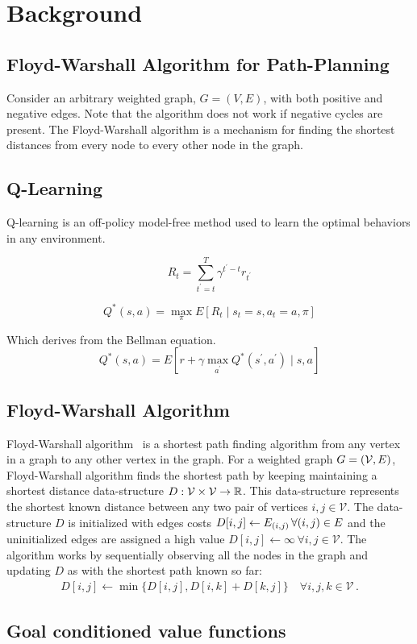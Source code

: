 \section{Background}

\subsection{Floyd-Warshall Algorithm for Path-Planning}

Consider an arbitrary weighted graph, $G = (V, E)$, with both positive and
negative edges. Note that the algorithm does not work if negative cycles
are present. The Floyd-Warshall algorithm is a mechanism for finding the
shortest distances from every node to every other node in the graph. 


\subsection{Q-Learning}
Q-learning is an off-policy model-free method used to learn the optimal
behaviors in any environment. 

\begin{equation}
    R_t = \sum_{t^{'}=t}^{T} \gamma^{t^{'}-t} r_{t^{'}}
\end{equation}

\begin{equation}
    Q^*(s, a) = \max_{\pi} E[R_t \mid s_t=s, a_t=a, \pi]
\end{equation}


\noindent
Which derives from the Bellman equation.
\begin{equation}
    Q^*(s, a) = E[r + \gamma \max_{a^{'}} Q^*(s^{'}, a^{'}) \mid s, a]
\end{equation}

\subsection{Floyd-Warshall Algorithm}
\newcommand{\vertices}{\mathcal{V}}
\newcommand{\wts}{W}
\newcommand{\fwds}{D}

Floyd-Warshall algorithm~\citep{floydwarshall1962} is a shortest path finding
algorithm from any vertex in a graph to any other vertex in the graph.
For a weighted graph $G = (\vertices, \edges)$, Floyd-Warshall algorithm
finds the shortest path by keeping maintaining a shortest distance
data-structure $\fwds : \vertices \times \vertices \rightarrow \R$.
This data-structure represents the shortest known distance between any
two pair of vertices $i, j \in \vertices$.
The data-structure $\fwds$ is initialized with edges costs
$\fwds[i, j] \leftarrow \edges_{(i, j)} \, \forall (i, j) \in \edges$
and the uninitialized edges are assigned a high value
$\fwds[i, j] \leftarrow \infty \, \forall i, j \in \vertices$.
The algorithm works by sequentially observing all the nodes in the graph and
updating $\fwds$ as with the shortest path known so far:
%
\begin{align}
  \fwds[i, j] \leftarrow \min\{ \fwds[i, j], \fwds[i, k] + \fwds[k, j] \} \quad
  \forall i, j, k \in \vertices \, .
\end{align}%
%

\subsection{Goal conditioned value functions}

